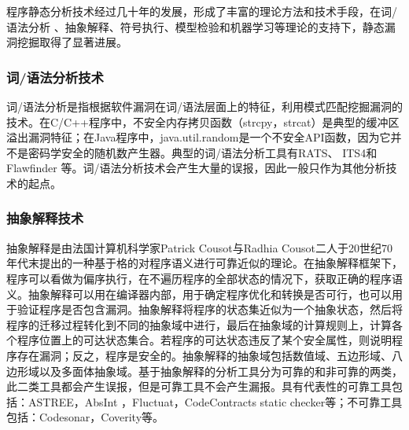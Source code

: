 
程序静态分析技术经过几十年的发展，形成了丰富的理论方法和技术手段，在词/语法分析
、抽象解释、符号执行、模型检验和机器学习等理论的支持下，静态漏洞挖掘取得了显著进展。

\subsubsection{词/语法分析技术}

词/语法分析是指根据软件漏洞在词/语法层面上的特征，利用模式匹配挖掘漏洞的技术。在C/C++程序中，不安全内存拷贝函数（strcpy，strcat）是典型的缓冲区溢出漏洞特征；在Java程序中，java.util.random是一个不安全API函数，因为它并不是密码学安全的随机数产生器。典型的词/语法分析工具有RATS、 ITS4和Flawfinder 等。词/语法分析技术会产生大量的误报，因此一般只作为其他分析技术的起点。

%

\subsubsection{抽象解释技术}

抽象解释是由法国计算机科学家Patrick Cousot与Radhia Cousot二人于20世纪70年代末提出的一种基于格的对程序语义进行可靠近似的理论。在抽象解释框架下，程序可以看做为偏序执行，在不遍历程序的全部状态的情况下，获取正确的程序语义。抽象解释可以用在编译器内部，用于确定程序优化和转换是否可行，也可以用于验证程序是否包含漏洞。抽象解释将程序的状态集近似为一个抽象状态，然后将程序的迁移过程转化到不同的抽象域中进行，最后在抽象域的计算规则上，计算各个程序位置上的可达状态集合。若程序的可达状态违反了某个安全属性，则说明程序存在漏洞；反之，程序是安全的。抽象解释的抽象域包括数值域、五边形域、八边形域以及多面体抽象域。基于抽象解释的分析工具分为可靠的和非可靠的两类，此二类工具都会产生误报，但是可靠工具不会产生漏报。具有代表性的可靠工具包括：ASTREE，AbsInt ，Fluctuat，CodeContracts static checker等；不可靠工具包括：Codesonar，Coverity等。

